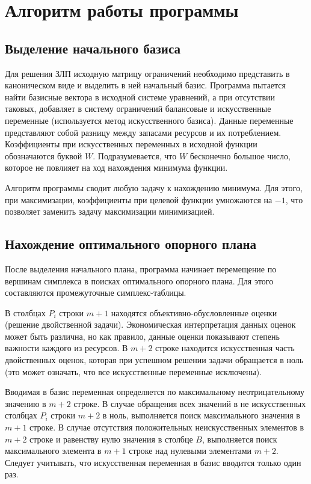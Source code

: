 \chapter{Алгоритм работы программы}
\section{Выделение начального базиса}
Для решения ЗЛП исходную матрицу ограничений необходимо представить в каноническом виде и выделить в ней начальный базис. Программа пытается найти базисные вектора в исходной системе уравнений, а при отсутствии таковых, добавляет в систему ограничений балансовые и искусственные переменные (используется метод искусственного базиса).
Данные переменные представляют собой разницу между запасами ресурсов и их потреблением. Коэффициенты при искусственных переменных в исходной функции обозначаются буквой $W$. Подразумевается, что $W$ бесконечно большое число, которое не повлияет на ход нахождения минимума функции.

Алгоритм программы сводит любую задачу к нахождению минимума. Для этого, при максимизации, коэффициенты при целевой функции умножаются на $-1$, что позволяет заменить задачу максимизации минимизацией.

\section{Нахождение оптимального опорного плана}
После выделения начального плана, программа начинает перемещение по вершинам симплекса в поисках оптимального опорного плана. Для этого составляются промежуточные симплекс-таблицы.

В столбцах $P_i$ строки $m+1$ находятся объективно-обусловленные оценки (решение двойственной задачи). Экономическая интерпретация данных оценок может быть различна, но как правило, данные оценки показывают степень важности каждого из ресурсов. В $m+2$ строке находится искусственная часть двойственных оценок, которая при успешном решении задачи обращается в ноль (это может означать, что все искусственные переменные исключены).

Вводимая в базис переменная определяется по максимальному неотрицательному значению в $m+2$ строке. В случае обращения всех значений в не искусственных столбцах $P_i$ строки $m+2$ в ноль, выполняется поиск максимального значения в $m+1$ строке. В случае отсутствия положительных неискусственных элементов в $m+2$ строке и равенству нулю значения в столбце $B$, выполняется поиск максимального элемента в $m+1$ строке над нулевыми элементами $m+2$. Следует учитывать, что искусственная переменная в базис вводится только один раз.

